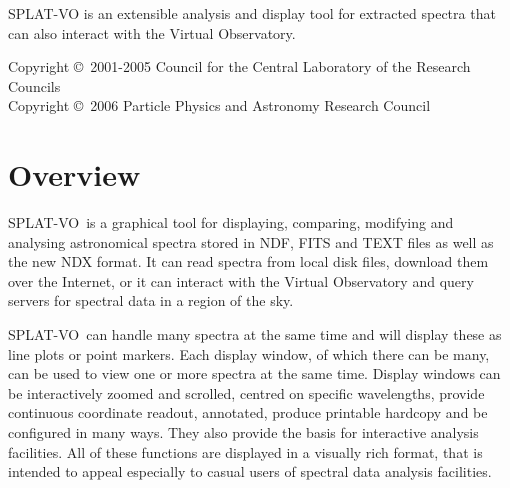 \documentclass[twoside,11pt]{article}
\newcommand{\stardocinitials}  {SUN}
\newcommand{\stardoccopyright}
{Copyright \copyright\ 2001-2005 Council for the Central Laboratory of the
Research Councils \\
Copyright \copyright\ 2006 Particle Physics and Astronomy Research Council}
\newcommand{\stardocnumber}    {243.18}
\newcommand{\stardocabstract}  {
\textsf{SPLAT-VO} is an extensible analysis and display tool for extracted
spectra that can also interact with the Virtual Observatory.
}
\newcommand{\stardocname}{\stardocinitials /\stardocnumber}
\newenvironment{latexonly}{}{}
\newcommand{\xlabel}[1]{}
\renewcommand{\_}{\texttt{\symbol{95}}}
\newcommand{\SPLAT}{\textsf{SPLAT-VO}}
\renewcommand{\thepage}{\roman{page}}
\begin{document}
\begin{center}
\stardocabstract
\end{center}

\begin{latexonly}
\newpage
\vspace*{\fill}
\stardoccopyright
\end{latexonly}

\newpage
\begin{latexonly}
  \setlength{\parskip}{0mm}
  \tableofcontents
  \setlength{\parskip}{\medskipamount}
  \markboth{\stardocname}{\stardocname}
\end{latexonly}

\cleardoublepage
\renewcommand{\thepage}{\arabic{page}}
\setcounter{page}{1}


\section{Overview\xlabel{overview}}

\SPLAT\ is a graphical tool for displaying, comparing, modifying and
analysing astronomical spectra stored in NDF, FITS and TEXT files as well as
the new NDX format. It can read spectra from local disk files, download them
over the Internet, or it can interact with the Virtual Observatory and query
servers for spectral data in a region of the sky.

\SPLAT\ can handle many spectra at the same time and will display these as
line plots or point markers.
Each display window, of which there can be many, can be used to
view one or more spectra at the same time.
Display windows can be interactively zoomed and scrolled, centred on
specific wavelengths, provide continuous coordinate readout, annotated,
produce printable hardcopy and be configured in many ways.
They also provide the basis for interactive analysis facilities.
All of these functions are displayed in a visually rich format, that
is intended to appeal especially to casual users of spectral data
analysis facilities.
\end{document}
